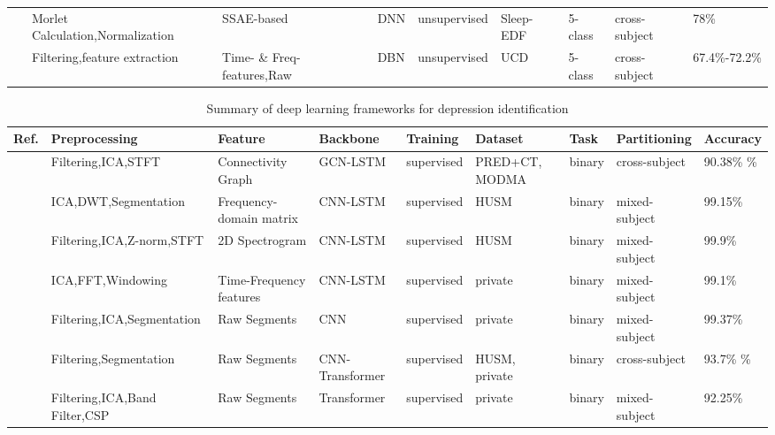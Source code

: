 \begin{table*}[ht]
\begin{tabular}{p{0.4cm}p{2.8cm}p{2cm}p{1.5cm}p{1.9cm}p{1.9cm}p{0.8cm}p{1.8cm}p{2cm}}
~\cite{Sleep74} & Morlet Calculation,\newline Normalization & SSAE-based & DNN & unsupervised & Sleep-EDF & 5-class  & cross-subject & 78\% \\
~\cite{Sleep75} & Filtering,feature extraction & Time- \& Freq- features,Raw & DBN & unsupervised & UCD & 5-class  & cross-subject & 67.4\%-72.2\% \\
\hline
\end{tabular}
\end{table*}

\begin{table*}[ht]
\renewcommand{\arraystretch}{1.2}
\caption{Summary of deep learning frameworks for depression identification}
\label{tab:mdds}
\footnotesize
\begin{tabular}{p{0.4cm}p{2.8cm}p{2cm}p{1.5cm}p{1.9cm}p{1.9cm}p{0.8cm}p{1.8cm}p{2cm}}
\hline
\textbf{Ref.} & \textbf{Preprocessing} & \textbf{Feature} & \textbf{Backbone} & \textbf{Training} & \textbf{Dataset} & \textbf{Task} & \textbf{Partitioning} & \textbf{Accuracy} \\
\hline
~\cite{MDD2} & Filtering,ICA,STFT & Connectivity Graph & GCN-LSTM & supervised & PRED+CT, \newline MODMA & binary & cross-subject & 90.38\% \newline 90.57\% \\
~\cite{MDD3} & ICA,DWT,Segmentation & Frequency-domain matrix & CNN-LSTM & supervised & HUSM & binary & mixed-subject & 99.15\% \\
~\cite{MDD4} & Filtering,ICA,Z-norm,\newline STFT & 2D Spectrogram & CNN-LSTM & supervised & HUSM & binary & mixed-subject & 99.9\% \\
~\cite{sharma2021dephnn} & ICA,FFT,Windowing & Time-Frequency features & CNN-LSTM & supervised & private & binary & mixed-subject & 99.1\% \\
~\cite{seal2021deprnet} & Filtering,ICA,Segmentation & Raw Segments & CNN & supervised & private & binary & mixed-subject & 99.37\% \\
~\cite{MDD7} & Filtering,Segmentation & Raw Segments & CNN-Transformer & supervised & HUSM,\newline
private & binary & cross-subject & 93.7\% \newline 96.2\% \\
~\cite{MDD8} & Filtering,ICA,Band \newline Filter,CSP & Raw Segments & Transformer & supervised & private & binary & mixed-subject & 92.25\% \\

\end{tabular}
\end{table*}
